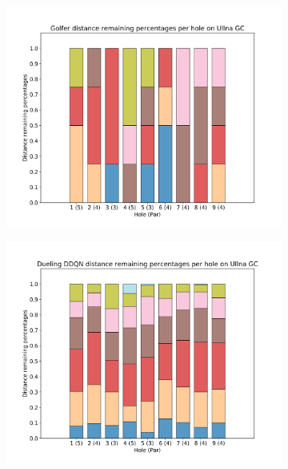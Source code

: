 \documentclass{kththesis}
\begin{document}
\begin{figure}
    \centering
    \begin{subfigure}{\textwidth}
    \centering
    \includegraphics[height=0.3\textheight]{L2Percentages/L2_Distance_Percentages_Ullna.png} 
    \end{subfigure}
    \begin{subfigure}{\textwidth}
    \centering
    \includegraphics[height=0.3\textheight]{AgentPercentages/DDDQN_Distance_Percentages_Ullna.png} 
    \end{subfigure}
    \begin{subfigure}{\textwidth}

\end{subfigure}
\end{figure}
\end{document}
